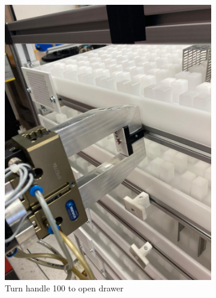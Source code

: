 \begin{figure}[h]
\begin{subfigure}[b]{0.32\textwidth}
        \includegraphics[width=\textwidth]{figures/shelf-control/open-handle.jpeg}
        \caption{Turn handle 100\textdegree{} to open drawer}
        \vspace{-0.45cm}
        \label{subfig:turn-open}
    \end{subfigure}\hspace{0.1cm}
    \begin{subfigure}[b]{0.32\textwidth}
        \centering

\end{subfigure}
\end{figure}
